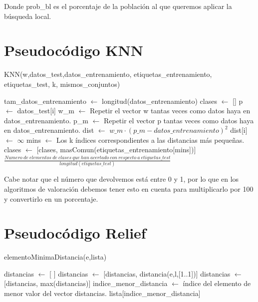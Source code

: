 \documentclass[12pt,a4paper]{article}
\begin{document}
	Donde prob\_bl es el porcentaje de la población al que queremos aplicar la búsqueda local.

	\newpage

	\section{Pseudocódigo KNN}
	\label{sec:knn}

	\begin{algorithm}
		\caption{KNN(w,datos\_test,datos\_entrenamiento, etiquetas\_entrenamiento, etiquetas\_test, k, mismos\_conjuntos)}
		\begin{algorithmic}
			\STATE tam\_datos\_entrenamiento $\leftarrow$ longitud(datos\_entrenamiento)
			\STATE clases $\leftarrow$ []
			\STATE p $\leftarrow$ datos\_test[i]
			\STATE w\_m $\leftarrow$ Repetir el vector w tantas veces como datos haya en datos\_entrenamiento.
			\STATE p\_m $\leftarrow$ Repetir el vector p tantas veces como datos haya en datos\_entrenamiento.
			\STATE dist $\leftarrow$ $w\_m \cdot (p\_m - datos\_entrenamiento)^2$
			\STATE dist[i] $\leftarrow$ $\infty$
			\ENDIF
			\STATE mins $\leftarrow$ Los k índices correspondientes a las distancias más pequeñas.
			\STATE clases $\leftarrow$ [clases, masComun(etiquetas\_entrenamiento[mins])]
			\ENDFOR
			\RETURN $\frac{Numero \ de \ elementos \ de \ clases \ que \ han \ acertado \ con \ respecto \ a \ etiquetas\_test}{longitud(etiquetas\_test)}$
		\end{algorithmic}
	\end{algorithm}

	Cabe notar que el número que devolvemos está entre 0 y 1, por lo que en los algoritmos de valoración debemos tener esto en cuenta para multiplicarlo por 100 y convertirlo en un porcentaje.

	\newpage

	\section{Pseudocódigo Relief}
	\label{sec:relief}

	\begin{algorithm}
		\caption{elementoMinimaDistancia(e,lista)}
		\begin{algorithmic}
			\STATE distancias $\leftarrow$ [ ]
			\FOR{l en lista}
			\IF{l!=e}
			\STATE distancias $\leftarrow$ [distancias, distancia(e,l,[1..1])]
			\ELSE
			\STATE distancias $\leftarrow$ [distancias, max(distancias)]
			\ENDIF
			\ENDFOR
			\STATE indice\_menor\_distancia $\leftarrow$ índice del elemento de menor valor del vector distancias.
			\RETURN lista[indice\_menor\_distancia]
		\end{algorithmic}
	\end{algorithm}
\end{document}
